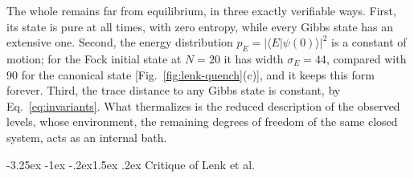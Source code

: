\documentclass[10pt,a4paper]{article}
\makeatletter
\renewcommand{\subsection}{\@startsection{subsection}{2}{\z@}%
  {-3.25ex \@plus -1ex \@minus -.2ex}{1.5ex \@plus .2ex}%
  {\normalfont\fontsize{15.5pt}{19pt}\selectfont\bfseries}}
\makeatother
\begin{document}
The whole remains far from equilibrium, in three exactly verifiable ways.
First, its state is pure at all times, with zero entropy, while every Gibbs state has an extensive one.
Second, the energy distribution $ p_E = |\langle E | \psi(0) \rangle|^2 $ is a constant of motion; for the Fock initial state at $ N = 20 $ it has width $ \sigma_E = 44 $, compared with $ 90 $ for the canonical state [Fig.~\ref{fig:lenk-quench}(c)], and it keeps this form forever.
Third, the trace distance to any Gibbs state is constant, by Eq.~\eqref{eq:invariants}.
What thermalizes is the reduced description of the observed levels, whose environment, the remaining degrees of freedom of the same closed system, acts as an internal bath.

\subsection{Critique of Lenk et al.}
\label{sec:lenk-critique}
\end{document}
